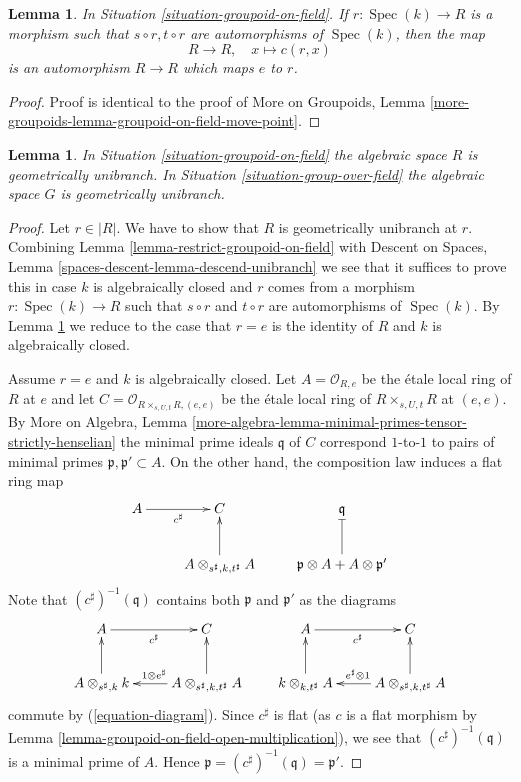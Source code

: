 \documentclass{stacks-project}
\theoremstyle{plain}
\newtheorem{lemma}[subsection]{Lemma}
\theoremstyle{definition}
\theoremstyle{remark}
\numberwithin{equation}{subsection}
\def\Spec{\mathop{\mathrm{Spec}}}
\begin{document}
\begin{lemma}
\label{lemma-groupoid-on-field-move-point}
In
Situation \ref{situation-groupoid-on-field}.
If $r : \Spec(k) \to R$ is a morphism such that
$s \circ r, t \circ r$ are automorphisms of $\Spec(k)$, then the map
$$
R \longrightarrow R, \quad
x \longmapsto c(r, x)
$$
is an automorphism $R \to R$ which maps $e$ to $r$.
\end{lemma}

\begin{proof}
Proof is identical to the proof of
More on Groupoids,
Lemma \ref{more-groupoids-lemma-groupoid-on-field-move-point}.
\end{proof}

\begin{lemma}
\label{lemma-groupoid-on-field-geometrically-irreducible}
In
Situation \ref{situation-groupoid-on-field}
the algebraic space $R$ is geometrically unibranch. In
Situation \ref{situation-group-over-field}
the algebraic space $G$ is geometrically unibranch.
\end{lemma}

\begin{proof}
Let $r \in |R|$. We have to show that $R$ is geometrically unibranch
at $r$. Combining
Lemma \ref{lemma-restrict-groupoid-on-field}
with
Descent on Spaces, Lemma \ref{spaces-descent-lemma-descend-unibranch}
we see that it suffices to prove this in case $k$ is algebraically closed
and $r$ comes from a morphism $r : \Spec(k) \to R$ such that
$s \circ r$ and $t \circ r$
are automorphisms of $\Spec(k)$. By
Lemma \ref{lemma-groupoid-on-field-move-point}
we reduce to the case that $r = e$ is the identity of $R$ and $k$ is
algebraically closed.

\medskip\noindent
Assume $r = e$ and $k$ is algebraically closed. Let
$A = \mathcal{O}_{R, e}$ be the \'etale local ring of
$R$ at $e$ and let
$C = \mathcal{O}_{R \times_{s, U, t} R, (e, e)}$
be the \'etale local ring of $R \times_{s, U, t} R$ at $(e, e)$.
By More on Algebra, Lemma
\ref{more-algebra-lemma-minimal-primes-tensor-strictly-henselian}
the minimal prime ideals $\mathfrak q$ of $C$ correspond $1$-to-$1$
to pairs of minimal primes $\mathfrak p, \mathfrak p' \subset A$.
On the other hand, the composition law induces a flat ring map
$$
\xymatrix{
A \ar[r]_{c^\sharp} & C & \mathfrak q \\
& A \otimes_{s^\sharp, k, t^\sharp} A \ar[u] &
\mathfrak p \otimes A + A \otimes \mathfrak p' \ar@{|}[u]
}
$$
Note that $(c^\sharp)^{-1}(\mathfrak q)$ contains both $\mathfrak p$ and
$\mathfrak p'$ as the diagrams
$$
\xymatrix{
A \ar[r]_{c^\sharp} & C \\
A \otimes_{s^\sharp, k} k \ar[u] &
A \otimes_{s^\sharp, k, t^\sharp} A \ar[l]_{1 \otimes e^\sharp} \ar[u]
}
\quad\quad
\xymatrix{
A \ar[r]_{c^\sharp} & C \\
k \otimes_{k, t^\sharp} A \ar[u] &
A \otimes_{s^\sharp, k, t^\sharp} A \ar[l]_{e^\sharp \otimes 1} \ar[u]
}
$$
commute by (\ref{equation-diagram}).
Since $c^\sharp$ is flat (as $c$ is a flat morphism by
Lemma \ref{lemma-groupoid-on-field-open-multiplication}),
we see that $(c^\sharp)^{-1}(\mathfrak q)$ is a minimal prime
of $A$. Hence $\mathfrak p = (c^\sharp)^{-1}(\mathfrak q) = \mathfrak p'$.
\end{proof}
\end{document}
